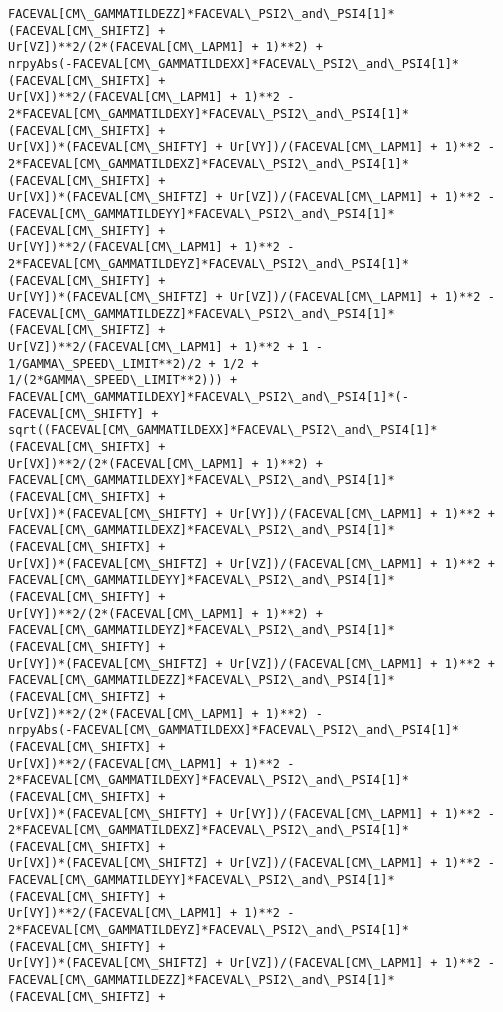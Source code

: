 \documentclass[landscape,letterpaper,10pt,english]{article}
\begin{document}
\begin{Verbatim}[commandchars=\\\{\}]
FACEVAL[CM\_GAMMATILDEZZ]*FACEVAL\_PSI2\_and\_PSI4[1]*(FACEVAL[CM\_SHIFTZ] +
Ur[VZ])**2/(2*(FACEVAL[CM\_LAPM1] + 1)**2) +
nrpyAbs(-FACEVAL[CM\_GAMMATILDEXX]*FACEVAL\_PSI2\_and\_PSI4[1]*(FACEVAL[CM\_SHIFTX] +
Ur[VX])**2/(FACEVAL[CM\_LAPM1] + 1)**2 -
2*FACEVAL[CM\_GAMMATILDEXY]*FACEVAL\_PSI2\_and\_PSI4[1]*(FACEVAL[CM\_SHIFTX] +
Ur[VX])*(FACEVAL[CM\_SHIFTY] + Ur[VY])/(FACEVAL[CM\_LAPM1] + 1)**2 -
2*FACEVAL[CM\_GAMMATILDEXZ]*FACEVAL\_PSI2\_and\_PSI4[1]*(FACEVAL[CM\_SHIFTX] +
Ur[VX])*(FACEVAL[CM\_SHIFTZ] + Ur[VZ])/(FACEVAL[CM\_LAPM1] + 1)**2 -
FACEVAL[CM\_GAMMATILDEYY]*FACEVAL\_PSI2\_and\_PSI4[1]*(FACEVAL[CM\_SHIFTY] +
Ur[VY])**2/(FACEVAL[CM\_LAPM1] + 1)**2 -
2*FACEVAL[CM\_GAMMATILDEYZ]*FACEVAL\_PSI2\_and\_PSI4[1]*(FACEVAL[CM\_SHIFTY] +
Ur[VY])*(FACEVAL[CM\_SHIFTZ] + Ur[VZ])/(FACEVAL[CM\_LAPM1] + 1)**2 -
FACEVAL[CM\_GAMMATILDEZZ]*FACEVAL\_PSI2\_and\_PSI4[1]*(FACEVAL[CM\_SHIFTZ] +
Ur[VZ])**2/(FACEVAL[CM\_LAPM1] + 1)**2 + 1 - 1/GAMMA\_SPEED\_LIMIT**2)/2 + 1/2 +
1/(2*GAMMA\_SPEED\_LIMIT**2))) +
FACEVAL[CM\_GAMMATILDEXY]*FACEVAL\_PSI2\_and\_PSI4[1]*(-FACEVAL[CM\_SHIFTY] +
sqrt((FACEVAL[CM\_GAMMATILDEXX]*FACEVAL\_PSI2\_and\_PSI4[1]*(FACEVAL[CM\_SHIFTX] +
Ur[VX])**2/(2*(FACEVAL[CM\_LAPM1] + 1)**2) +
FACEVAL[CM\_GAMMATILDEXY]*FACEVAL\_PSI2\_and\_PSI4[1]*(FACEVAL[CM\_SHIFTX] +
Ur[VX])*(FACEVAL[CM\_SHIFTY] + Ur[VY])/(FACEVAL[CM\_LAPM1] + 1)**2 +
FACEVAL[CM\_GAMMATILDEXZ]*FACEVAL\_PSI2\_and\_PSI4[1]*(FACEVAL[CM\_SHIFTX] +
Ur[VX])*(FACEVAL[CM\_SHIFTZ] + Ur[VZ])/(FACEVAL[CM\_LAPM1] + 1)**2 +
FACEVAL[CM\_GAMMATILDEYY]*FACEVAL\_PSI2\_and\_PSI4[1]*(FACEVAL[CM\_SHIFTY] +
Ur[VY])**2/(2*(FACEVAL[CM\_LAPM1] + 1)**2) +
FACEVAL[CM\_GAMMATILDEYZ]*FACEVAL\_PSI2\_and\_PSI4[1]*(FACEVAL[CM\_SHIFTY] +
Ur[VY])*(FACEVAL[CM\_SHIFTZ] + Ur[VZ])/(FACEVAL[CM\_LAPM1] + 1)**2 +
FACEVAL[CM\_GAMMATILDEZZ]*FACEVAL\_PSI2\_and\_PSI4[1]*(FACEVAL[CM\_SHIFTZ] +
Ur[VZ])**2/(2*(FACEVAL[CM\_LAPM1] + 1)**2) -
nrpyAbs(-FACEVAL[CM\_GAMMATILDEXX]*FACEVAL\_PSI2\_and\_PSI4[1]*(FACEVAL[CM\_SHIFTX] +
Ur[VX])**2/(FACEVAL[CM\_LAPM1] + 1)**2 -
2*FACEVAL[CM\_GAMMATILDEXY]*FACEVAL\_PSI2\_and\_PSI4[1]*(FACEVAL[CM\_SHIFTX] +
Ur[VX])*(FACEVAL[CM\_SHIFTY] + Ur[VY])/(FACEVAL[CM\_LAPM1] + 1)**2 -
2*FACEVAL[CM\_GAMMATILDEXZ]*FACEVAL\_PSI2\_and\_PSI4[1]*(FACEVAL[CM\_SHIFTX] +
Ur[VX])*(FACEVAL[CM\_SHIFTZ] + Ur[VZ])/(FACEVAL[CM\_LAPM1] + 1)**2 -
FACEVAL[CM\_GAMMATILDEYY]*FACEVAL\_PSI2\_and\_PSI4[1]*(FACEVAL[CM\_SHIFTY] +
Ur[VY])**2/(FACEVAL[CM\_LAPM1] + 1)**2 -
2*FACEVAL[CM\_GAMMATILDEYZ]*FACEVAL\_PSI2\_and\_PSI4[1]*(FACEVAL[CM\_SHIFTY] +
Ur[VY])*(FACEVAL[CM\_SHIFTZ] + Ur[VZ])/(FACEVAL[CM\_LAPM1] + 1)**2 -
FACEVAL[CM\_GAMMATILDEZZ]*FACEVAL\_PSI2\_and\_PSI4[1]*(FACEVAL[CM\_SHIFTZ] +

\end{Verbatim}
\end{document}
